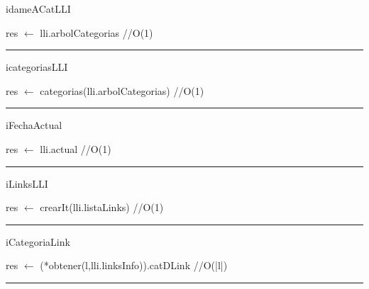 \begin{algorithm}[H]
\caption{idameACatLLI}
\begin{algorithmic}[1]
\state res $\gets$ lli.arbolCategorias \hfill //O(1)
\EndFunction 
\end{algorithmic}
\hrule
{}
\end{algorithm}

\begin{algorithm}[H]
\caption{icategoriasLLI}
\begin{algorithmic}[1]
\state res $\gets$ categorias(lli.arbolCategorias) \hfill //O(1)
\EndFunction 
\end{algorithmic}
\hrule
{}
\end{algorithm}

\begin{algorithm}[H]
\caption{iFechaActual}
\begin{algorithmic}[1]
\state res $\gets$ lli.actual \hfill //O(1)
\EndFunction 
\end{algorithmic}
\hrule
{}
\end{algorithm}

\begin{algorithm}[H]
\caption{iLinksLLI}
\begin{algorithmic}[1]
\state res $\gets$ crearIt(lli.listaLinks) \hfill //O(1)
\EndFunction 
\end{algorithmic}
\hrule
{}
\end{algorithm}

\begin{algorithm}[H]
\caption{iCategoriaLink}
\begin{algorithmic}[1]
\state res $\gets$ (*obtener(l,lli.linksInfo)).catDLink \hfill //O(|l|)
\EndFunction 
\end{algorithmic}
\hrule
{}
\end{algorithm}

